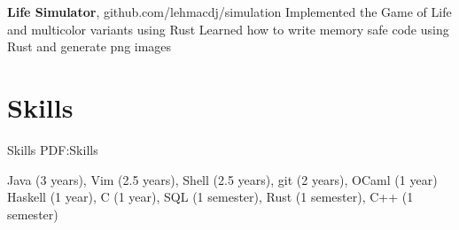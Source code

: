 \documentclass[letterpaper,10pt,oneside]{simpleresume}
\begin{document}
\begin{minipage}[t][0pt]{\linewidth}
\begin{body}

\textbf{Life Simulator}, github.com/lehmacdj/simulation
\BulletItem%
Implemented the Game of Life and multicolor variants using Rust
\BulletItem%
Learned how to write memory safe code using Rust and generate png images

\section%
{Skills}
{Skills}
{PDF:Skills}

\BulletItem%
Java (3 years), Vim (2.5 years), Shell (2.5 years), git (2 years),
OCaml (1 year)
\BulletItem%
Haskell (1 year), C (1 year), SQL (1 semester), Rust (1 semester),
C++ (1 semester)

\end{body}
\end{minipage}
\end{document}
